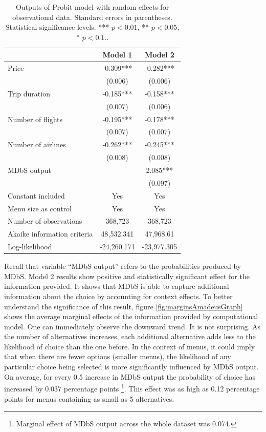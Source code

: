 \documentclass[a4paper,12pt]{article}
\begin{document}
\begin{table}
    \centering

    \begin{tabular}{lcc}
    \hline
     & Model 1 & Model 2 \\
    \hline
    Price & -0.309*** & -0.282*** \\
     & (0.006) & (0.006) \\[1ex]
    Trip duration & -0.185*** & -0.158*** \\
     & (0.007) & (0.006) \\[1ex]
    Number of flights & -0.195*** & -0.178*** \\
     & (0.007) & (0.007) \\[1ex]
    Number of airlines & -0.262*** & -0.245*** \\
     & (0.008) & (0.008) \\[1ex]
    MDbS output & & 2.085*** \\
     & & (0.097) \\[1ex]
    Constant included & Yes & Yes \\[1ex]
    Menu size as control & Yes & Yes \\[1ex]
    Number of observations & 368,723 & 368,723 \\[1ex]
    Akaike information criteria & 48,532.341 & 47,968.61 \\[1ex]
    Log-likelihood & -24,260.171 & -23,977.305 \\[1ex]
    \hline
    \end{tabular}
    \caption[Outputs of Probit model for observational data]{Outputs of Probit model with random effects for observational data. Standard errors in parentheses. Statistical significance levels: *** $p<0.01$, ** $p<0.05$, * $p<0.1.$.}
    \label{tab:amadeusProbitResults}
\end{table}

Recall that variable ``MDbS output'' refers to the probabilities produced by MDbS. Model 2 results show positive and statistically significant effect for the information provided. It shows that MDbS is able to capture additional information about the choice by accounting for context effects. To better understand the significance of this result, figure \ref{fig:marginsAmadeusGraph} shows the average marginal effects of the information provided by computational model. One can immediately observe the downward trend. It is not surprising. As the number of alternatives increases, each additional alternative adds less to the likelihood of choice than the one before. In the context of menus, it could imply that when there are fewer options (smaller menus), the likelihood of any particular choice being selected is more significantly influenced by MDbS output. On average, for every 0.5 increase in MDbS output the probability of choice has increased by 0.037 percentage points \footnote{Marginal effect of MDbS output across the whole dataset was 0.074.}. This effect was as high as 0.12 percentage points for menus containing as small as 5 alternatives. 
\end{document}
